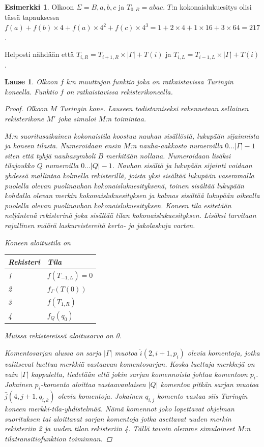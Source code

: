 \documentclass[a4paper, 12pt]{article}
\theoremstyle{definition}
\newtheorem{example}[mydef]{Esimerkki}
\theoremstyle{plain}
\newtheorem{teor}[mydef]{Lause}
\begin{document}
\begin{example}
Olkoon $\Sigma = {B, a, b, c}$ ja $T_{0, R} = abac$. $T$:n kokonaislukuesitys olisi tässä tapauksessa $f(a) + f(b) \times 4 + f(a) \times 4^2 + f(c) \times 4^3= 1 + 2 \times 4 + 1 \times 16 + 3 \times 64 = 217$.
\end{example}

Helposti nähdään että $T_{i,R} = T_{i+1,R} \times |\Gamma| + T(i)$ ja $T_{i,L} = T_{i-1,L} \times |\Gamma| + T(i)$.


\begin{teor}
Olkoon $f$ k:n muuttujan funktio joka on ratkaistavissa Turingin koneella. Funktio $f$ on ratkaistavissa rekisterikoneella.
\begin{proof}
Olkoon $M$ Turingin kone. Lauseen todistamiseksi rakennetaan sellainen rekisterikone $M'$ joka simuloi $M$:n toimintaa.

$M$:n suoritusaikainen kokonaistila koostuu nauhan sisällöstä, lukupään sijainnista ja koneen tilasta. Numeroidaan ensin $M$:n nauha-aakkosto numeroilla $0 ... |\Gamma|-1$ siten että tyhjä nauhasymboli $B$ merkitään nollana. Numeroidaan lisäksi tilajoukko $Q$ numeroilla $0 ... |Q| - 1$. Nauhan sisältö ja lukupään sijainti voidaan yhdessä mallintaa kolmella rekisterillä, joista yksi sisältää lukupään vasemmalla puolella olevan puolinauhan kokonaislukuesityksenä, toinen sisältää lukupään kohdalla olevan merkin kokonaislukuesityksen ja kolmas sisältää lukupään oikealla puolella olevan puolinauhan kokonaislukuesityksen. Koneen tila esitetään neljäntenä rekisterinä joka sisältää tilan kokonaislukuesityksen. Lisäksi tarvitaan rajallinen määrä laskureistereitä kerto- ja jakolaskuja varten.

Koneen aloitustila on
\begin{center}
\begin{tabular}{l l}
Rekisteri & Tila \\
\hline
1 & $f(T_{-1, L}) = 0$ \\
2 & $f_{\Gamma}(T(0))$ \\
3 & $f(T_{1, R})$ \\
4 & $f_Q(q_0)$ \\
\end{tabular}
\end{center}
Muissa rekistereissä aloitusarvo on 0.

Komentosarjan alussa on sarja $|\Gamma|$ muotoa $\hat{i} (2, i+1, p_i)$ olevia komentoja, jotka valitsevat luettua merkkiä vastaavan komentosarjan. Koska luettuja merkkejä on vain $|\Gamma|$ kappaletta, tiedetään että jokin sarjan komennoista johtaa komentoon $p_i$. Jokainen $p_i$-komento aloittaa vastaavanlaisen $|Q|$ komentoa pitkän sarjan muotoa $\hat{j} (4, j+1, q_{i,k})$  olevia komentoja. Jokainen $q_{i,j}$ komento vastaa siis Turingin koneen merkki-tila-yhdistelmää. Nämä komennot joko lopettavat ohjelman suorituksen tai aloittavat sarjan komentoja jotka asettavat uuden merkin rekisteriin 2 ja uuden tilan rekisteriin 4. Tällä tavoin olemme simuloineet $M$:n tilatransitiofunktion toiminnan.


\end{proof}
\end{teor}
\end{document}
